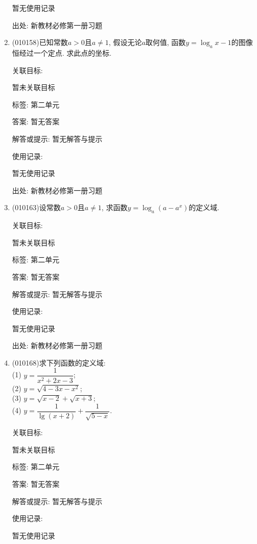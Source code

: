 \documentclass[10pt,a4paper]{article}
\begin{document}
\begin{enumerate}[1.]
暂无使用记录


出处: 新教材必修第一册习题
\item { (010158)}已知常数$a>0$且$a\ne 1$, 假设无论$a$取何值, 函数$y=\log_ax-1$的图像恒经过一个定点. 求此点的坐标.


关联目标:

暂未关联目标



标签: 第二单元

答案: 暂无答案

解答或提示: 暂无解答与提示

使用记录:

暂无使用记录


出处: 新教材必修第一册习题
\item { (010163)}设常数$a>0$且$a\ne 1$, 求函数$y=\log_a(a-a^x)$的定义域.


关联目标:

暂未关联目标



标签: 第二单元

答案: 暂无答案

解答或提示: 暂无解答与提示

使用记录:

暂无使用记录


出处: 新教材必修第一册习题
\item { (010168)}求下列函数的定义域:\\
(1) $y=\dfrac1{x^2+2x-3}$;\\
(2) $y=\sqrt{4-3x-x^2}$;\\
(3) $y=\sqrt{x-2}+\sqrt{x+3}$;\\
(4) $y=\dfrac 1{\lg(x+2)}+\dfrac 1{\sqrt{5-x}}$.


关联目标:

暂未关联目标



标签: 第二单元

答案: 暂无答案

解答或提示: 暂无解答与提示

使用记录:

暂无使用记录



\end{enumerate}
\end{document}
